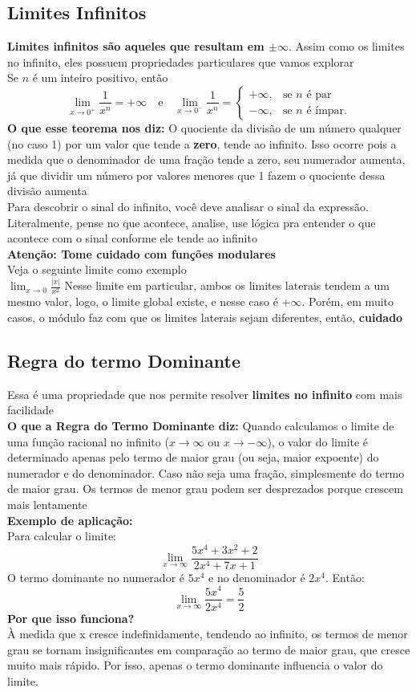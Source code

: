 \documentclass{article}
\begin{document}
\subsection{Limites Infinitos}
\textbf{Limites infinitos são aqueles que resultam em $\pm\infty$}. Assim como os limites no infinito, eles possuem propriedades particulares que vamos explorar\\[10pt]
Se \( n \) é um inteiro positivo, então
\[
\lim_{x \to 0^+} \frac{1}{x^n} = +\infty
\quad \text{e} \quad
\lim_{x \to 0^-} \frac{1}{x^n} = 
\begin{cases} 
+\infty, & \text{se } n \text{ é par} \\
-\infty, & \text{se } n \text{ é ímpar}.
\end{cases}
\]
\textbf{O que esse teorema nos diz:} O quociente da divisão de um número qualquer (no caso 1) por um valor que tende a \textbf{zero}, tende ao infinito. Isso ocorre pois a medida que o denominador de uma fração tende a zero, seu numerador aumenta, já que dividir um número por valores menores que 1 fazem o quociente dessa divisão aumenta
\\[10pt]
Para descobrir o sinal do infinito, você deve analisar o sinal da expressão. Literalmente, pense no que acontece, analise, use lógica pra entender o que acontece com o sinal conforme ele tende ao infinito\\[10pt]
\textbf{Atenção: Tome cuidado com funções modulares}
\\
Veja o seguinte limite como exemplo\\[10pt]
$\displaystyle\lim_{x \to 0} \frac{|x|}{x^{2}}$ Nesse limite em particular, ambos os limites laterais tendem a um mesmo valor, logo, o limite global existe, e nesse caso é +$\infty$. Porém, em muito casos, o módulo faz com que os limites laterais sejam diferentes, então, \textbf{cuidado}
\subsection{Regra do termo Dominante}
Essa é uma propriedade que nos permite resolver \textbf{limites no infinito} com mais facilidade\\[10pt]
\textbf{O que a Regra do Termo Dominante diz:} Quando calculamos o limite de uma função racional no infinito (\( x \to \infty \) ou \( x \to -\infty \)), o valor do limite é determinado apenas pelo termo de maior grau (ou seja, maior expoente) do numerador e do denominador. Caso não seja uma fração, simplesmente do termo de maior grau. Os termos de menor grau podem ser desprezados porque crescem mais lentamente\\[10pt]
\textbf{Exemplo de aplicação:}\\[10pt]
Para calcular o limite:
\[
\lim_{x \to \infty} \frac{5x^4 + 3x^2 + 2}{2x^4 + 7x + 1}
\]
O termo dominante no numerador é \(5x^4\) e no denominador é \(2x^4\). Então:
\[
\lim_{x \to \infty} \frac{5x^4}{2x^4} = \frac{5}{2}
\]
\textbf{Por que isso funciona?}\\À medida que x cresce indefinidamente, tendendo ao infinito, os termos de menor grau se tornam insignificantes em comparação ao termo de maior grau, que cresce muito mais rápido. Por isso, apenas o termo dominante influencia o valor do limite.
\end{document}
